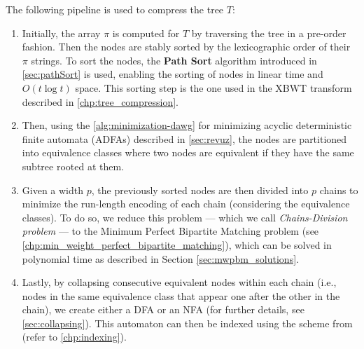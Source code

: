 The following pipeline is used to compress the tree $T$:
\begin{enumerate}
    \item Initially, the array $\pi$ is computed for $T$ by traversing the tree in a pre-order fashion. Then the nodes are stably sorted by the lexicographic order of their $\pi$ strings. To sort the nodes, the \textbf{Path Sort} algorithm introduced in \cref{sec:pathSort} is used, enabling the sorting of nodes in linear time and $O(t \log t)$ space. This sorting step is the one used in the XBWT transform described in \cref{chp:tree_compression}.
    \item Then, using the \cref{alg:minimization-dawg} for minimizing acyclic deterministic finite automata (ADFAs) described in \cref{sec:revuz}, the nodes are partitioned into equivalence classes where two nodes are equivalent if they have the same subtree rooted at them.
    \item Given a width $p$, the previously sorted nodes are then divided into $p$ chains to minimize the run-length encoding of each chain (considering the equivalence classes). To do so, we reduce this problem --- which we call \emph{Chains-Division problem} --- to the Minimum Perfect Bipartite Matching problem (see \cref{chp:min_weight_perfect_bipartite_matching}), which can be solved in polynomial time as described in Section \cref{sec:mwpbm_solutions}.
    \item Lastly, by collapsing consecutive equivalent nodes within each chain (i.e., nodes in the same equivalence class that appear one after the other in the chain), we create either a DFA or an NFA (for further details, see \cref{sec:collapsing}). This automaton can then be indexed using the scheme from \cite{cotumaccio2023co} (refer to \cref{chp:indexing}). %
\end{enumerate}
